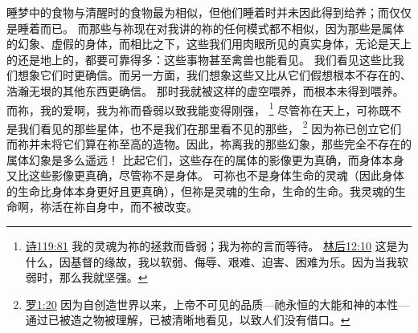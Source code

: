\documentclass[12pt, a4paper, oneside]{ctexart}
\begin{document}
    睡梦中的食物与清醒时的食物最为相似，但他们睡着时并未因此得到给养；而仅仅是睡着而已。
    而那些与祢现在对我讲的祢的任何模式都不相似，因为那些是属体的幻象、虚假的身体，而相比之下，这些我们用肉眼所见的真实身体，无论是天上的还是地上的，都要可靠得多：这些事物甚至禽兽也能看见。
    我们看见这些比我们想象它们时更确信。而另一方面，我们想象这些又比从它们假想根本不存在的、浩瀚无垠的其他东西更确信。
    那时我就被这样的虚空喂养，而根本未得到喂养。
    而祢，我的爱啊，我为祢而昏弱以致我能变得刚强，
    \footnote {
        \href{https://biblehub.com/psalms/119-81.htm}{诗119:81} 我的灵魂为祢的拯救而昏弱；我为祢的言而等待。
        \href{https://biblehub.com/2_corinthians/12-10.htm}{林后12:10} 这是为什么，因基督的缘故，我以软弱、侮辱、艰难、迫害、困难为乐。因为当我软弱时，那么我就坚强。
	}
    尽管祢在天上，可祢既不是我们看见的那些星体，也不是我们在那里看不见的那些，
    \footnote {
		\href{https://biblehub.com/romans/1-20.htm}{罗1:20} 因为自创造世界以来，上帝不可见的品质---祂永恒的大能和神的本性---通过已被造之物被理解，已被清晰地看见，以致人们没有借口。
	}
    因为祢已创立它们而祢并未将它们算在祢至高的造物。因此，祢离我的那些幻象，那些完全不存在的属体幻象是多么遥远！
    比起它们，这些存在的属体的影像更为真确，而身体本身又比这些影像更真确，尽管祢不是身体。
    可祢也不是身体生命的灵魂（因此身体的生命比身体本身更好且更真确），但祢是灵魂的生命，生命的生命。我灵魂的生命啊，祢活在祢自身中，而不被改变。
\end{document}
